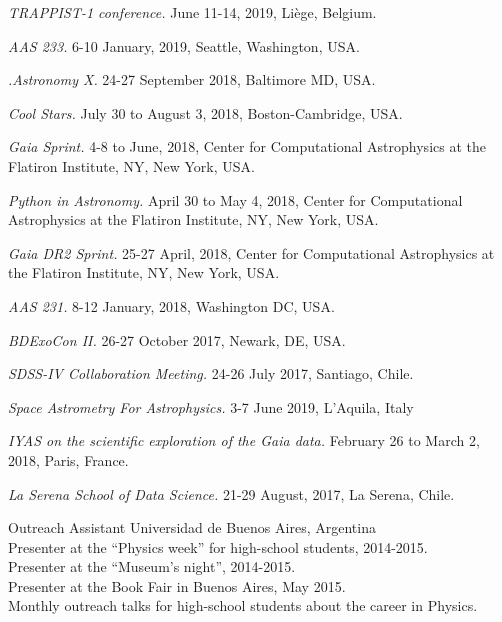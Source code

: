 \documentclass[10pt]{cv}
\newcommand\tab[1][1cm]{\hspace*{#1}}
\begin{document}
\begin{llist}
\textit{TRAPPIST-1 conference.} June 11-14, 2019, Li\`ege, Belgium.

\textit{AAS 233.} 6-10 January, 2019, Seattle, Washington, USA.

\textit{.Astronomy X.} 24-27 September 2018, Baltimore MD, USA.

\textit{Cool Stars.} July 30 to August 3, 2018, Boston-Cambridge, USA.

\textit{Gaia Sprint.} 4-8 to June, 2018, Center for Computational Astrophysics at the Flatiron Institute, NY, New York, USA.

\textit{Python in Astronomy.}  April 30 to May 4, 2018, Center for Computational Astrophysics at the Flatiron Institute, NY, New York, USA. 

\textit{Gaia DR2 Sprint.} 25-27 April, 2018, Center for Computational Astrophysics at the Flatiron Institute, NY, New York, USA. 

\textit{AAS 231.} 8-12 January, 2018, Washington DC, USA.

\textit{BDExoCon II.} 26-27 October 2017, Newark, DE, USA.

\textit{SDSS-IV Collaboration Meeting.} 24-26 July 2017, Santiago, Chile.

\textit{Space Astrometry For Astrophysics.} 3-7 June 2019, L'Aquila, Italy

\textit{IYAS on the scientific exploration of the Gaia data.} February 26 to March 2, 2018, Paris, France.

\textit{La Serena School of Data Science.} 21-29 August, 2017, La Serena, Chile.

Outreach Assistant
Universidad de Buenos Aires, Argentina\\
\tab Presenter at the ``Physics week'' for high-school students, 2014-2015.\\
\tab Presenter at the ``­Museum's night'', 2014-2015.\\
\tab Presenter at the Book Fair in Buenos Aires, May 2015.\\
\tab Monthly outreach talks for high-school students about the career in Physics.


\end{llist}
\end{document}
